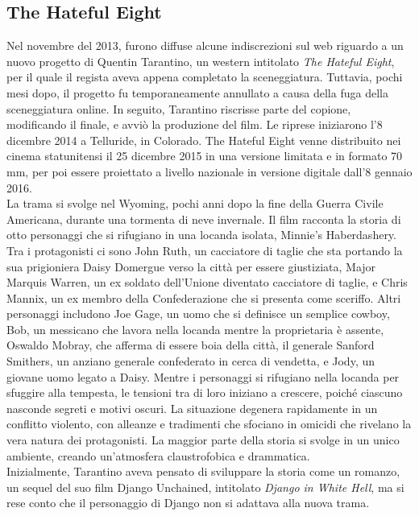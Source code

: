 \documentclass[12pt]{article} %
\begin{document}
\subsection{The Hateful Eight}
\begin{flushleft}
    Nel novembre del 2013, furono diffuse alcune indiscrezioni sul web riguardo a un nuovo progetto di Quentin Tarantino, un western intitolato \textit{The Hateful Eight}, per il quale il regista aveva appena completato la sceneggiatura. Tuttavia, pochi mesi dopo, il progetto fu temporaneamente annullato a causa della fuga della sceneggiatura online. In seguito, Tarantino riscrisse parte del copione, modificando il finale, e avviò la produzione del film. Le riprese iniziarono l'8 dicembre 2014 a Telluride, in Colorado. The Hateful Eight venne distribuito nei cinema statunitensi il 25 dicembre 2015 in una versione limitata e in formato 70 mm, per poi essere proiettato a livello nazionale in versione digitale dall'8 gennaio 2016. 
    \\\vspace{1cm}
    La trama si svolge nel Wyoming, pochi anni dopo la fine della Guerra Civile Americana, durante una tormenta di neve invernale. Il film racconta la storia di otto personaggi che si rifugiano in una locanda isolata, Minnie’s Haberdashery. Tra i protagonisti ci sono John Ruth, un cacciatore di taglie che sta portando la sua prigioniera Daisy Domergue verso la città per essere giustiziata, Major Marquis Warren, un ex soldato dell'Unione diventato cacciatore di taglie, e Chris Mannix, un ex membro della Confederazione che si presenta come sceriffo. Altri personaggi includono Joe Gage, un uomo che si definisce un semplice cowboy, Bob, un messicano che lavora nella locanda mentre la proprietaria è assente, Oswaldo Mobray, che afferma di essere boia della città, il generale Sanford Smithers, un anziano generale confederato in cerca di vendetta, e Jody, un giovane uomo legato a Daisy. 
    Mentre i personaggi si rifugiano nella locanda per sfuggire alla tempesta, le tensioni tra di loro iniziano a crescere, poiché ciascuno nasconde segreti e motivi oscuri. La situazione degenera rapidamente in un conflitto violento, con alleanze e tradimenti che sfociano in omicidi che rivelano la vera natura dei protagonisti. 
    La maggior parte della storia si svolge in un unico ambiente, creando un'atmosfera claustrofobica e drammatica. 
    \\\vspace{1cm}
     Inizialmente, Tarantino aveva pensato di sviluppare la storia come un romanzo, un sequel del suo film Django Unchained, intitolato \textit{Django in White Hell}, ma si rese conto che il personaggio di Django non si adattava alla nuova trama.

\end{flushleft}
\end{document}
